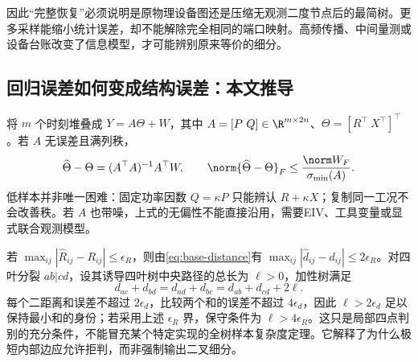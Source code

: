 \begin{center}
\end{center}

因此“完整恢复”必须说明是原物理设备图还是压缩无观测二度节点后的最简树。更多采样能缩小统计误差，却不能解除完全相同的端口映射。高频传播、中间量测或设备台账改变了信息模型，才可能辨别原来等价的细分。

\subsection{回归误差如何变成结构误差：本文推导}
将 $m$ 个时刻堆叠成 $Y=A\Theta+W$，其中 $A=[P\ Q]\in\R^{m\times2n}$、$\Theta=[R^\top\ X^\top]^\top$。若 $A$ 无误差且满列秩，
\begin{equation}
 \widehat\Theta-\Theta=(A^\top A)^{-1}A^\top W,
 \qquad \norm{\widehat\Theta-\Theta}_F\leq\frac{\norm W_F}{\sigma_{\min}(A)}.
\end{equation}
低样本并非唯一困难：固定功率因数 $Q=\kappa P$ 只能辨认 $R+\kappa X$；复制同一工况不会改善秩。若 $A$ 也带噪，上式的无偏性不能直接沿用，需要EIV、工具变量或显式联合观测模型。

若 $\max_{ij}|\widehat R_{ij}-R_{ij}|\leq\epsilon_R$，则由\eqref{eq:base-distance}有 $\max_{ij}|\widehat d_{ij}-d_{ij}|\leq2\epsilon_R$。对四叶分裂 $ab|cd$，设其诱导四叶树中央路径的总长为 $\ell>0$，加性树满足
\begin{equation}
 d_{ac}+d_{bd}=d_{ad}+d_{bc}=d_{ab}+d_{cd}+2\ell.
\end{equation}
每个二距离和误差不超过 $2\epsilon_d$，比较两个和的误差不超过 $4\epsilon_d$，因此 $\ell>2\epsilon_d$ 足以保持最小和的身份；若采用上述 $\epsilon_R$ 界，保守条件为 $\ell>4\epsilon_R$。这只是局部四点判别的充分条件，不能冒充某个特定实现的全树样本复杂度定理。它解释了为什么极短内部边应允许拒判，而非强制输出二叉细分。

